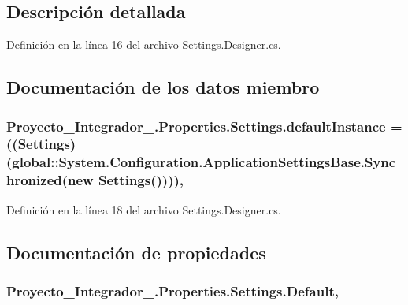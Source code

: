 \subsection{Descripción detallada}


Definición en la línea 16 del archivo Settings.\-Designer.\-cs.



\subsection{Documentación de los datos miembro}
\hypertarget{class_proyecto___integrador__3_1_1_properties_1_1_settings_a0506f261ec13f63859843f202056c917}{
\subsubsection[{default\-Instance}]{ Proyecto\-\_\-\-Integrador\-\_.\-Properties.\-Settings.\-default\-Instance = (({\bf Settings})(global\-::\-System.\-Configuration.\-Application\-Settings\-Base.\-Synchronized(new {\bf Settings}())))\hspace{0.3cm}{\ttfamily [static]}, {\ttfamily [private]}}}\label{class_proyecto___integrador__3_1_1_properties_1_1_settings_a0506f261ec13f63859843f202056c917}


Definición en la línea 18 del archivo Settings.\-Designer.\-cs.



\subsection{Documentación de propiedades}
\hypertarget{class_proyecto___integrador__3_1_1_properties_1_1_settings_ac74497e82c6360793c1eb24ddce6e7b1}{
\subsubsection[{Default}]{ Proyecto\-\_\-\-Integrador\-\_.\-Properties.\-Settings.\-Default\hspace{0.3cm}{\ttfamily [static]}, {\ttfamily [get]}}}\label{class_proyecto___integrador__3_1_1_properties_1_1_settings_ac74497e82c6360793c1eb24ddce6e7b1}


